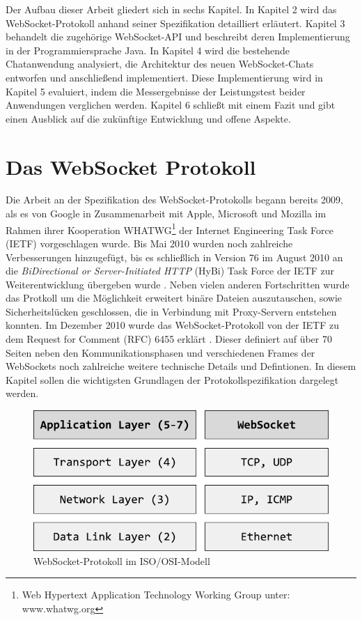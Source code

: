 \documentclass[11pt,a4paper,titlepage]{scrartcl}
\numberwithin{equation}{section}
\begin{document}
\noindent Der Aufbau dieser Arbeit gliedert sich in sechs Kapitel. In Kapitel 2 wird das WebSocket-Protokoll anhand seiner Spezifikation detailliert erläutert. Kapitel 3 behandelt die zugehörige WebSocket-API und beschreibt deren Implementierung in der Programmiersprache Java. In Kapitel 4 wird die bestehende Chatanwendung analysiert, die Architektur des neuen WebSocket-Chats entworfen und anschließend implementiert. Diese Implementierung wird in Kapitel 5 evaluiert, indem die Messergebnisse der Leistungstest beider Anwendungen verglichen werden. Kapitel 6 schließt mit einem Fazit und gibt einen Ausblick auf die zukünftige Entwicklung und offene Aspekte.

\newpage
\section{Das WebSocket Protokoll}\label{sec:WebSocketProtokoll}
Die Arbeit an der Spezifikation des WebSocket-Protokolls begann bereits 2009, als es von Google in Zusammenarbeit mit Apple, Microsoft und Mozilla im Rahmen ihrer Kooperation WHATWG\footnote{Web Hypertext Application Technology Working Group unter: www.whatwg.org} der Internet Engineering Task Force (IETF) vorgeschlagen wurde. Bis Mai 2010 wurden noch zahlreiche Verbesserungen hinzugefügt, bis es schließlich in Version 76 \autocite{hickson_websocket_2010} im August 2010 an die \textit{BiDirectional or Server-Initiated HTTP} (HyBi) Task Force der IETF zur Weiterentwicklung übergeben wurde \autocite{fette_websocket_2010}. Neben vielen anderen Fortschritten wurde das Protkoll um die Möglichkeit erweitert binäre Dateien auszutauschen, sowie Sicherheitslücken geschlossen, die in Verbindung mit Proxy-Servern entstehen konnten. Im Dezember 2010 wurde das WebSocket-Protokoll von der IETF zu dem Request for Comment (RFC) 6455 erklärt \autocite{fette_websocket_2011}. Dieser definiert auf über 70 Seiten neben den Kommunikationsphasen und verschiedenen Frames der WebSockets noch zahlreiche weitere technische Details und Defintionen. In diesem Kapitel sollen die wichtigsten Grundlagen der Protokollspezifikation dargelegt werden.\\
\begin{figure}[ht] \label{fig:wsOSI}
\begin{center}
	\includegraphics[scale=1]{img/osi.pdf}
	\caption{WebSocket-Protokoll im ISO/OSI-Modell}
\end{center}
\end{figure}
\end{document}
